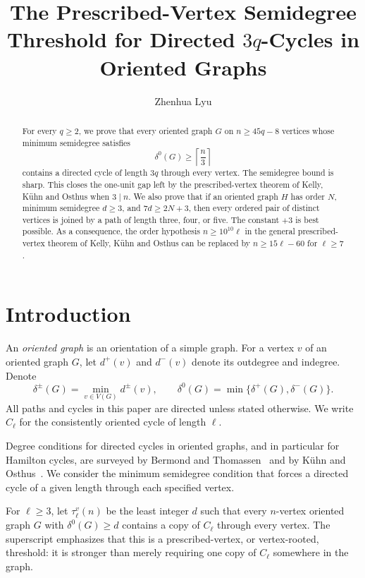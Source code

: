 \documentclass[11pt]{amsart}
\title[The prescribed-vertex threshold for $C_{3q}$]{The Prescribed-Vertex Semidegree Threshold for Directed $3q$-Cycles in Oriented Graphs}
\author{Zhenhua Lyu}
\date{}
\theoremstyle{definition}
\begin{document}
\begin{abstract}
For every $q\ge2$, we prove that every oriented graph $G$ on
$n\ge45q-8$ vertices whose minimum semidegree satisfies
\[
  \delta^0(G)\ge \left\lceil\frac n3\right\rceil
\]
contains a directed cycle of length $3q$ through every vertex.  The
semidegree bound is sharp.  This closes the one-unit gap left by the
prescribed-vertex theorem of Kelly, K\"uhn and Osthus when $3\mid n$.
We also prove that  if an oriented graph
$H$ has order $N$, minimum semidegree $d\ge3$, and $7d\ge2N+3$, then
every ordered pair of distinct vertices is joined by a path of length
three, four, or five.
The constant $+3$ is best possible.  As a consequence, the order
hypothesis $n\ge10^{10}\ell$ in the general prescribed-vertex theorem
of Kelly, K\"uhn and Osthus can be replaced by $n\ge15\ell-60$ for
$\ell\ge7$.
\end{abstract}

\maketitle

\section{Introduction}

An \emph{oriented graph} is an orientation of a simple graph.  For a vertex $v$ of an oriented graph $G$, let $d^+(v)$ and $d^-(v)$ denote its outdegree and indegree.  Denote
\[
  \delta^\pm(G)=\min_{v\in V(G)}d^\pm(v),
  \qquad
  \delta^0(G)=\min\{\delta^+(G),\delta^-(G)\}.
\]
All paths and cycles in this paper are directed unless stated otherwise.  We write $C_\ell$ for the consistently oriented cycle of length $\ell$.

Degree conditions for directed cycles in oriented graphs, and in particular
for Hamilton cycles, are surveyed by Bermond and Thomassen~\cite{BT} and by
K\"uhn and Osthus~\cite{KOsurvey}.  We consider the minimum semidegree condition
that forces a directed cycle of a given length through each specified
vertex.

For $\ell\ge3$, let $\tau^v_\ell(n)$ be the least integer $d$ such
that every $n$-vertex oriented graph $G$ with $\delta^0(G)\ge d$
contains a copy of $C_\ell$ through every vertex.  The superscript
emphasizes that this is a prescribed-vertex, or vertex-rooted, threshold:
it is stronger than merely requiring one copy of $C_\ell$ somewhere in
the graph.
\end{document}
